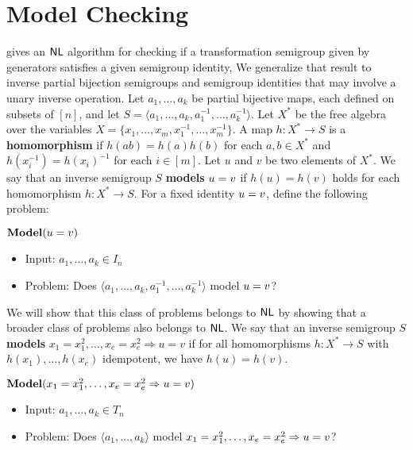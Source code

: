 \documentclass{amsart}
\newcommand{\Modelbf}{\mathbf{Model}}
\newcommand{\eq}{\ensuremath\mathrel{=}}
\newcommand{\NL}{\ensuremath\mathsf{NL}}
\theoremstyle{remark}
\numberwithin{equation}{section}
\begin{document}
\section{Model Checking}

\cite[Thm 5.1]{FJ:CP} gives an $\NL$ algorithm for checking if a transformation semigroup given by generators satisfies a given semigroup identity, We generalize that result to inverse partial bijection semigroups and semigroup identities that may involve a unary inverse operation. Let $a_1,\dots,a_k$ be partial bijective maps, each defined on subsets of $[n]$, and let $S= \langle a_1,\dots,a_k,a_1^{-1},\dots,a_k^{-1}\rangle$. Let $X^*$ be the free algebra over the variables $X = \{x_1,\dots,x_m,x_1^{-1},\dots,x_m^{-1}\}$. A map $h:X^* \to S$ is a {\bf homomorphism} if $h(ab) = h(a)h(b)$ for each $a,b \in X^*$ and $h(x_i^{-1}) = h(x_i)^{-1}$ for each $i \in [m]$. Let $u$ and $v$ be two elements of $X^*$. We say that an inverse semigroup $S$ {\bf models} $u \eq v$ if $h(u) = h(v)$ holds for each homomorphism $h:X^* \to S$. For a fixed identity $u \eq v$, define the following problem:

\medskip
{$\Modelbf(u \eq v)$}
\begin{itemize}
\item Input: $a_1,\dots,a_k \in I_n$
\item Problem: Does $\langle a_1,\dots,a_k,a_1^{-1},\dots,a_k^{-1} \rangle$ model $u \eq v$?
\end{itemize} 

We will show that this class of problems belongs to $\NL$ by showing that a broader class of problems also belongs to $\NL$. We say that an inverse semigroup $S$ {\bf models} $x_1 = x_1^2,\dots,x_e = x_e^2 \Rightarrow u = v$ if for all homomorphisms $h \colon X^* \to S$ with $h(x_1), \dots, h(x_e)$ idempotent, we have $h(u) = h(v)$.

\medskip
{$\Modelbf(x_1 \eq x_1^2,\dots,x_e \eq x_e^2 \Rightarrow u \eq v)$}
\begin{itemize}
\item Input: $a_1,\dots,a_k \in T_n$
\item Problem: Does $\langle a_1,\dots,a_k \rangle$ model $x_1 \eq x_1^2,\dots,x_e \eq x_e^2 \Rightarrow u \eq v$?
\end{itemize}
\end{document}
